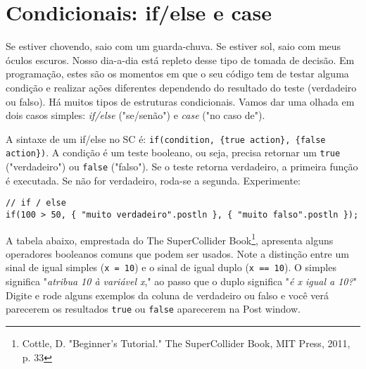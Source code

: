 \section{Condicionais: if/else e case}

Se estiver chovendo, saio com um guarda-chuva. Se estiver sol, saio com meus óculos escuros. Nosso dia-a-dia está repleto desse tipo de tomada de decisão. Em programação, estes são os momentos em que o seu código tem de testar alguma condição e realizar ações diferentes dependendo do resultado do teste (verdadeiro ou falso). Há muitos tipos de estruturas condicionais. Vamos dar uma olhada em dois casos simples: \emph{if/else} ("se/senão") e \emph{case} ("no caso de").

A sintaxe de um if/else no SC é: \texttt{if(condition, \{true action\}, \{false action\})}. A condição é um teste booleano, ou seja, precisa retornar um \texttt{true} ("verdadeiro") ou \texttt{false} ("falso"). Se o teste retorna verdadeiro, a primeira função é executada. Se não for verdadeiro, roda-se a segunda. Experimente:

\begin{lstlisting}[style=SuperCollider-IDE, basicstyle=\scttfamily\footnotesize]
// if / else 
if(100 > 50, { "muito verdadeiro".postln }, { "muito falso".postln });
\end{lstlisting}

A tabela abaixo, emprestada do The SuperCollider Book\footnote{Cottle, D. "Beginner's Tutorial." The SuperCollider Book, MIT Press, 2011, p. 33}, apresenta alguns operadores booleanos comuns que podem ser usados.
Note a distinção entre um sinal de igual simples (\texttt{x = 10}) e o sinal de igual duplo (\texttt{x == 10}). O simples significa "\textit{atribua 10 à variável x}," ao passo que o duplo significa "\textit{é x igual a 10?}" Digite e rode alguns exemplos da coluna de verdadeiro ou falso e você verá parecerem os resultados \texttt{true} ou  \texttt{false} aparecerem na Post window.
 

